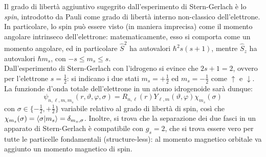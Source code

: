Il grado di libertà aggiuntivo sugegrito dall'esperimento di Stern-Gerlach è lo \textit{spin}, introdotto da Pauli come grado di libertà interno non-classico dell'elettrone. In particolare, lo spin può essere visto (in maniera imprecisa) come il momento angolare intrinseco dell'elettrone: matematicamente, esso si comporta come un momento angolare, ed in particolare $ \hat{S}^2 $ ha autovalori $ \hbar^2 s(s+1) $, mentre $ \hat{S}_z $ ha autovalori $ \hbar m_s $, con $ -s \le m_s \le s $.\\
Dall'esperimento di Stern-Gerlach con l'idrogeno si evince che $ 2s + 1 = 2 $, ovvero per l'elettrone $ s = \frac{1}{2} $: si indicano i due stati $ m_s = + \frac{1}{2} $ ed $ m_s = - \frac{1}{2} $ come $ \uparrow $ e $ \downarrow $. La funzionde d'onda totale dell'elettrone in un atomo idrogenoide sarà dunque:
\begin{equation}
	\psi_{n,\ell,m,m_s}(r,\vartheta,\varphi,\sigma) = R_{n,\ell}(r) Y_{\ell,m}(\vartheta,\varphi) \chi_{m_s}(\sigma)
\end{equation}
con $ \sigma \in \{-\frac{1}{2} , +\frac{1}{2}\} $ variabile relativo al grado di libertà di spin, così che $ \chi_{m_s}(\sigma) = \braket{\sigma | m_s} = \delta_{m_s , \sigma} $. Inoltre, si trova che la separazione dei due fasci in un apparato di Stern-Gerlach è compatibile con $ g_s = 2 $, che si trova essere vero per tutte le particelle fondamentali (structure-less): al momento magnetico orbitale va aggiunto un momento magnetico di spin.

